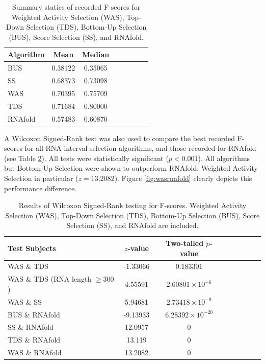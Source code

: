\documentclass{cshonours}
\begin{document}
\begin{table}
\centering
\begin{tabular}{l*{6}{c}r}
Algorithm	& Mean & Median \\
\hline
BUS &  0.38122    &    0.35065   \\
SS & 0.68373    &    0.73098  \\
WAS & 0.70395   &     0.75709  \\
TDS & 0.71684   &     0.80000  \\
\hline
RNAfold & 0.57483    &    0.60870 \\
\end{tabular}

\caption{Summary statics of recorded F-scores for Weighted Activity Selection (WAS), Top-Down Selection (TDS), Bottom-Up Selection (BUS), Score Selection (SS), and RNAfold.}
\label{tab:summaryselection}
\end{table}



A Wilcoxon Signed-Rank test was also used to compare the best recorded F-scores for all RNA interval selection algorithms, and those recorded for RNAfold (see Table \ref{tab:wilcoxonselection}). All tests were statistically significant ($p < 0.001$). All algorithms but Bottom-Up Selection were shown to outperform RNAfold; Weighted Activity Selection in particular ($z = 13.2082$). Figure \ref{fig:wasrnafold} clearly depicts this performance difference.


\begin{table}
\centering
\begin{tabular}{l*{6}{c}r}
Test Subjects	& $z$-value & Two-tailed $p$-value \\
\hline
WAS \& TDS 	& -1.33066 &	0.183301 \\
WAS \& TDS (RNA length $\geq 300$)	& 4.55591 &	$2.60801 \times 10 ^{-6}$ \\
WAS \& SS & 5.94681 &	$2.73418 \times 10^{-9}$  \\
\hline
BUS \& RNAfold & -9.13933 &	$6.28392 \times 10^{-20}$  \\
SS \& RNAfold & 12.0957 &	0  \\
TDS \& RNAfold & 13.119 &	0  \\
WAS \& RNAfold & 13.2082 &	0  \\
\end{tabular}

\caption{Results of Wilcoxon Signed-Rank testing for F-scores. Weighted Activity Selection (WAS), Top-Down Selection (TDS), Bottom-Up Selection (BUS), Score Selection (SS), and RNAfold are included.}
\label{tab:wilcoxonselection}
\end{table}
\end{document}
